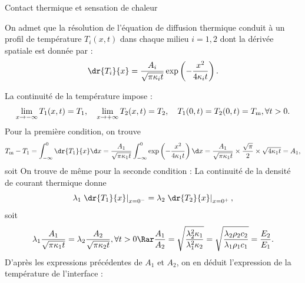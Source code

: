 \begin{exo}[PC][1][colle]{Contact thermique et sensation de chaleur}
\begin{quest}
{    }
  \end{quest}
  On admet que la résolution de l’équation de diffusion thermique conduit à un profil de température $T_i(x,t)$ dans chaque milieu $i=1,2$ dont la dérivée spatiale est donnée par :
    \begin{equation}
      \dr{T_i}{x} = \frac{A_i}{\sqrt{\pi \kappa_i t}} \exp\left(-\frac{x^2}{4 \kappa_i t}\right).
    \end{equation}
    \begin{quest}
    {
      La continuité de la température impose :
      $$
      \lim_{x \to -\infty} T_1(x,t) = T_1, \quad \lim_{x \to +\infty} T_2(x,t) = T_2, \quad T_1(0,t) = T_2(0,t) = T_{\rm m}, \forall t>0.
      $$
      Pour la première condition, on trouve 
      $$
       T_{\rm m} -T_1 = \int_{-\infty}^0 \dr{T_1}{x} \d x  = \frac{A_1}{\sqrt{\pi \kappa_1 t}} \int_{-\infty}^0 \exp\left(-\frac{x^2}{4 \kappa_1 t}\right) \d x = \frac{A_1}{\sqrt{\pi \kappa_1 t}} \times \frac{\sqrt{\pi}}{2} \times  \sqrt{4 \kappa_1 t} = A_1,
      $$
      soit 
      On trouve de même pour la seconde condition :
    }
    {
      La continuité de la densité de courant thermique donne 
      $$
      \lambda_1 \left. \dr{T_1}{x} \right|_{x=0^-} = \lambda_2 \left. \dr{T_2}{x} \right|_{x=0^+},
      $$
      soit 
      $$
      \lambda_1 \frac{A_1}{\sqrt{\pi \kappa_1 t}} = \lambda_2 \frac{A_2}{\sqrt{\pi \kappa_2 t}}, \forall t>0 \Rar \frac{A_1}{A_2} = \sqrt{\frac{\lambda_2^2 \kappa_1}{\lambda_1^2 \kappa_2}} = \sqrt{\frac{\lambda_2 \rho_2 c_2}{\lambda_1 \rho_1 c_1}} =  \frac{E_2}{E_1}.
      $$
      D’après les expressions précédentes de $A_1$ et $A_2$, on en déduit l’expression de la température de l’interface :
}
\end{quest}
\end{exo}
